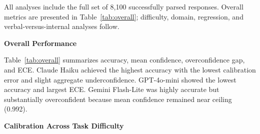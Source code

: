 \documentclass[twoside,twocolumn,10pt]{article}
\begin{document}
All analyses include the full set of 8{,}100 successfully parsed responses. Overall metrics are presented in Table~\ref{tab:overall}; difficulty, domain, regression, and verbal-versus-internal analyses follow.

\textbf{Overall Performance}

\begin{table}[!htbp]
\centering
\caption{Overall performance metrics by model (bootstrap 95\% CIs).}
\label{tab:overall}
\end{table}

Table~\ref{tab:overall} summarizes accuracy, mean confidence, overconfidence gap, and ECE. Claude Haiku achieved the highest accuracy with the lowest calibration error and slight aggregate underconfidence. GPT-4o-mini showed the lowest accuracy and largest ECE. Gemini Flash-Lite was highly accurate but substantially overconfident because mean confidence remained near ceiling (0.992).

\textbf{Calibration Across Task Difficulty}
\end{document}

